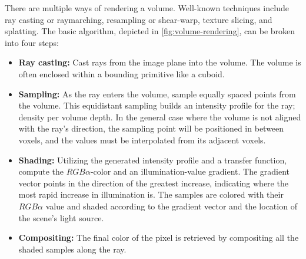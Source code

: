 
There are multiple ways of rendering a volume. Well-known techniques include ray casting or raymarching, resampling or shear-warp, texture slicing, and splatting. The basic algorithm, depicted in \autoref{fig:volume-rendering}, can be broken into four steps:

\begin{itemize}
    \item \textbf{Ray casting:} Cast rays from the image plane into the volume. The volume is often enclosed within a bounding primitive like a cuboid.
    \item \textbf{Sampling:} As the ray enters the volume, sample equally spaced points from the volume. This equidistant sampling builds an intensity profile for the ray; density per volume depth. In the general case where the volume is not aligned with the ray's direction, the sampling point will be positioned in between voxels, and the values must be interpolated from its adjacent voxels.
    \item \textbf{Shading:} Utilizing the generated intensity profile and a transfer function, compute the $RGB\alpha$-color and an illumination-value gradient. The gradient vector points in the direction of the greatest increase, indicating where the most rapid increase in illumination is. The samples are colored with their $RGB\alpha$ value and shaded according to the gradient vector and the location of the scene's light source.
    \item \textbf{Compositing:} The final color of the pixel is retrieved by compositing all the shaded samples along the ray. 
\end{itemize}




\begin{comment}
\subsection{Alpha compositing}
Alpha compositing is the process of combining one image with a background to create the appearance of partial or full transparency \cite{wiki:Alpha_compositing}.

\subsection{Ray marching}
\end{comment}



